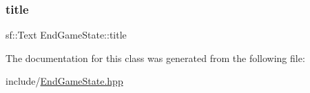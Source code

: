 \subsubsection{\texorpdfstring{title}{title}}
{\footnotesize\ttfamily sf\+::\+Text End\+Game\+State\+::title\hspace{0.3cm}{\ttfamily [private]}}



The documentation for this class was generated from the following file\+:\begin{DoxyCompactItemize}
\item 
include/\mbox{\hyperlink{_end_game_state_8hpp}{End\+Game\+State.\+hpp}}\end{DoxyCompactItemize}
